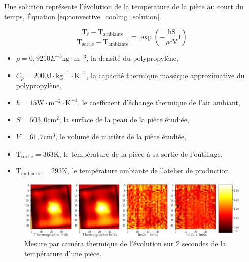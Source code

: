 Une solution représente l'évolution de la température de la pièce au court du temps, Équation \ref{eq:convective_cooling_solution}.

\begin{equation}\label{eq:convective_cooling_solution}
\frac{\mathrm{T}_t-\mathrm{T}_{\text{ambiante}}}{\mathrm{T}_{\mathrm{sortie}}-\mathrm{T}_{\text{ambiante}}}=\exp \left(-\frac{\mathrm{hS}}{\rho \mathrm{c} \mathrm{V}} \mathrm{t}\right)
\end{equation}

\begin{itemize}
	\item $\rho = 0,92 10E^{-3} \text{kg}\cdot \text{m}^{-3}$, la densité du polypropylène,
	\item $C_p = 2000 \text{J}\cdot \text{kg}^{-1}\cdot \text{K}^{-1}$, la capacité thermique massique approximative du polypropylène,
	\item $h = 15 \text{W}\cdot \text{m}^{-2}\cdot \text{K}^{-1}$, le coefficient d'échange thermique de l'air ambiant,%
	\item $S = 503,0 \text{cm}^2$, la surface de la peau de la pièce étudiée,
	\item $V = 61,7 \text{cm}^3$, le volume de matière de la pièce étudiée,
	\item $\mathrm{T}_{\text{sortie}} = 363\text{K}$, le température de la pièce à sa sortie de l'outillage,
	\item $\mathrm{T}_{\text{ambiante}} = 293\text{K}$, le température ambiante de l'atelier de production.
\end{itemize}

\begin{figure}[hbtp]
	\centering
	\includegraphics[width=\textwidth]{../Chap2/Figures/thermo_dynamic.jpg}
	\caption{Mesure par caméra thermique de l'évolution sur 2 secondes de la température d'une pièce.}
	\label{fig:thermo_dynamic}
\end{figure}


